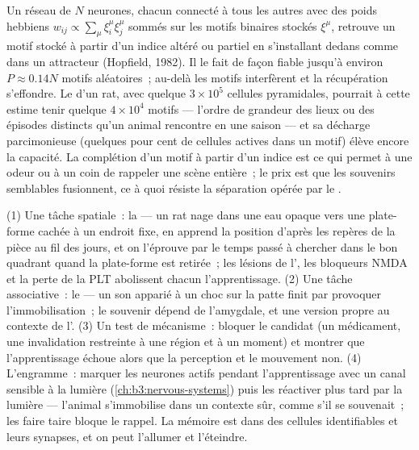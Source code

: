 \begin{proposition}\label{prop:b3:learning-memory:capacity}
Un réseau de $N$ neurones, chacun connecté à tous les autres avec des
poids hebbiens $w_{ij} \propto \sum_{\mu}\xi_{i}^{\mu}\xi_{j}^{\mu}$
sommés sur les motifs binaires stockés $\xi^{\mu}$, retrouve un motif
stocké à partir d'un indice altéré ou partiel en s'installant dedans
comme dans un attracteur (Hopfield, 1982). Il le fait de façon fiable
jusqu'à environ $P
\approx 0.14N$ motifs aléatoires~; au-delà les motifs interfèrent et la
récupération s'effondre. Le  d'un rat, avec quelque $3\times 10^{5}$
cellules pyramidales, pourrait à cette estime tenir quelque
$4\times 10^{4}$ motifs --- l'ordre de grandeur des lieux ou des
épisodes distincts qu'un animal rencontre en une saison --- et sa
décharge parcimonieuse (quelques pour cent de cellules actives dans un
motif) élève encore la capacité. La complétion d'un motif à partir d'un
indice est ce qui permet à une odeur ou à un coin de rappeler une scène
entière~; le prix est que les souvenirs semblables fusionnent, ce à quoi
résiste la séparation opérée par le .
\end{proposition}
\admitted

\begin{method}\label{met:b3:learning-memory:tests}
(1) Une tâche spatiale~: la  --- un rat nage dans une
eau opaque vers une plate-forme cachée à un endroit fixe, en apprend la
position d'après les repères de la pièce au fil des jours, et on
l'éprouve par le temps passé à chercher dans le bon quadrant quand la
plate-forme est retirée~; les lésions de l', les bloqueurs
NMDA et la perte de la PLT abolissent chacun l'apprentissage. (2) Une
tâche associative~: le  --- un son apparié à un
choc sur la patte finit par provoquer l'immobilisation~; le souvenir
dépend de l'amygdale, et une version propre au contexte de
l'. (3) Un test de mécanisme~: bloquer le candidat (un
médicament, une invalidation restreinte à une région et à un moment) et
montrer que l'apprentissage échoue alors que la perception et le
mouvement non. (4) L'engramme~: marquer les neurones actifs pendant
l'apprentissage avec un canal sensible à la lumière
(\cref{ch:b3:nervous-systems}) puis les réactiver plus tard par la
lumière --- l'animal s'immobilise dans un contexte sûr, comme s'il se
souvenait~; les faire taire bloque le rappel. La mémoire est dans des
cellules identifiables et leurs synapses, et on peut l'allumer et
l'éteindre.
\end{method}

